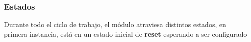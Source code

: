 \documentclass[conference,compsoc]{IEEEtran}
\begin{document}
\subsubsection{Estados}
Durante todo el ciclo de trabajo, el m\'odulo atraviesa distintos estados, en
primera instancia, est\'a en un estado inicial de \textbf{reset} esperando a ser
configurado

%
%



%
%
\end{document}
